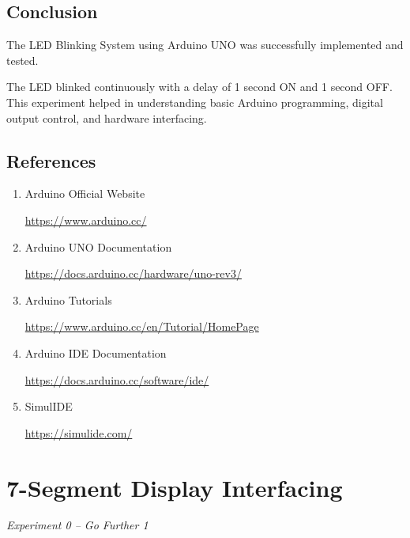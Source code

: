 
\subsection{Conclusion}

The LED Blinking System using Arduino UNO was successfully implemented and tested.

The LED blinked continuously with a delay of 1 second ON and 1 second OFF. This experiment helped in understanding basic Arduino programming, digital output control, and hardware interfacing.


\subsection{References}

\begin{enumerate}
    \item Arduino Official Website

    \url{https://www.arduino.cc/}

    \item Arduino UNO Documentation

    \url{https://docs.arduino.cc/hardware/uno-rev3/}

    \item Arduino Tutorials

    \url{https://www.arduino.cc/en/Tutorial/HomePage}

    \item Arduino IDE Documentation

    \url{https://docs.arduino.cc/software/ide/}

    \item SimulIDE

    \url{https://simulide.com/}

    
\end{enumerate}

\clearpage

\section{7-Segment Display Interfacing}

\textit{Experiment 0 -- Go Further 1}

